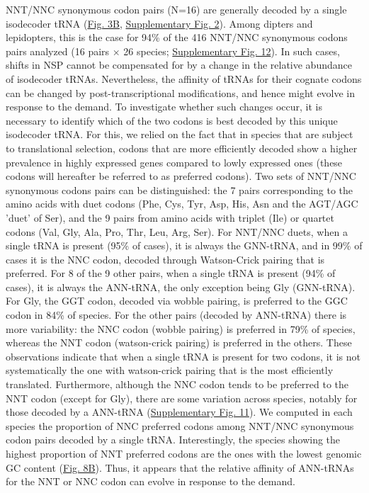 NNT/NNC synonymous codon pairs (N=16) are generally decoded by a single isodecoder tRNA (\hyperref[fig:CU3]{Fig. 3B}, \hyperref[suppfig:CU2]{Supplementary Fig. 2}). Among dipters and lepidopters, this is the case for 94\% of the 416 NNT/NNC synonymous codons pairs analyzed (16 pairs $\times$ 26 species; \hyperref[suppfig:CU12]{Supplementary Fig. 12}). In such cases, shifts in NSP cannot be compensated for by a change in the relative abundance of isodecoder tRNAs. Nevertheless, the affinity of tRNAs for their cognate codons can be changed by post-transcriptional modifications, and hence might evolve in response to the demand. To investigate whether such changes occur, it is necessary to identify which of the two codons is best decoded by this unique isodecoder tRNA. For this, we relied on the fact that in species that are subject to translational selection, codons that are more efficiently decoded show a higher prevalence in highly expressed genes compared to lowly expressed ones (these codons will hereafter be referred to as preferred codons). Two sets of NNT/NNC synonymous codons pairs can be distinguished: the 7 pairs corresponding to the amino acids with duet codons (Phe, Cys, Tyr, Asp, His, Asn and the AGT/AGC 'duet' of Ser), and the 9 pairs from amino acids with triplet (Ile) or quartet codons (Val, Gly, Ala, Pro, Thr, Leu, Arg, Ser). For NNT/NNC duets, when a single tRNA is present (95\% of cases), it is always the GNN-tRNA, and in 99\% of cases it is the NNC codon, decoded through Watson-Crick pairing that is preferred. For 8 of the 9 other pairs, when a single tRNA is present (94\% of cases), it is always the ANN-tRNA, the only exception being Gly (GNN-tRNA). For Gly, the GGT codon, decoded via wobble pairing, is preferred to the GGC codon in 84\% of species. For the other pairs (decoded by ANN-tRNA) there is more variability: the NNC codon (wobble pairing) is preferred in 79\% of species, whereas the NNT codon (watson-crick pairing) is preferred in the others. These observations indicate that when a single tRNA is present for two codons, it is not systematically the one with watson-crick pairing that is the most efficiently translated. Furthermore, although the NNC codon tends to be preferred to the NNT codon (except for Gly), there are some variation across species, notably for those decoded by a ANN-tRNA (\hyperref[suppfig:CU11]{Supplementary Fig. 11}). We computed in each species the proportion of NNC preferred codons among NNT/NNC synonymous codon pairs decoded by a single tRNA. Interestingly, the species showing the highest proportion of NNT preferred codons are the ones with the lowest genomic GC content (\hyperref[fig:CU8]{Fig. 8B}). Thus, it appears that the relative affinity of ANN-tRNAs for the NNT or NNC codon can evolve in response to the demand. 

